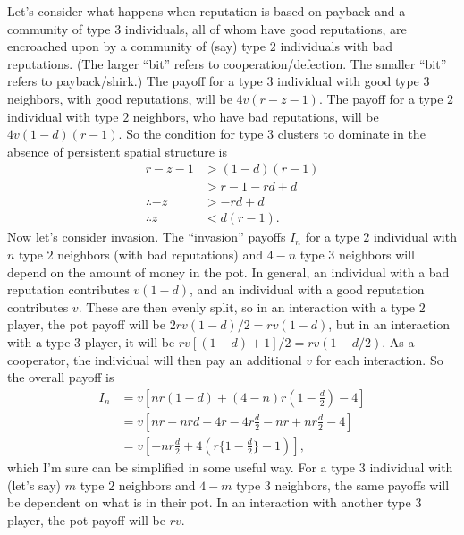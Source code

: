 \documentclass[14pt, a4paper, justified]{article}
\begin{document}
Let's consider what happens when reputation is based on payback and a community of type $3$ individuals, all of whom have good reputations, are encroached upon by a community of (say) type $2$ individuals with bad reputations.
(The larger ``bit'' refers to cooperation/defection.
The smaller ``bit'' refers to payback/shirk.)
The payoff for a type $3$ individual with good type $3$ neighbors, with good reputations, will be $4v(r - z - 1)$.
The payoff for a type $2$ individual with type $2$ neighbors, who have bad reputations, will be $4v(1-d)(r-1)$.
So the condition for type $3$ clusters to dominate in the absence of persistent spatial structure is
\begin{equation}
    \begin{split}
        r - z - 1 & > (1-d)(r-1) \\
        & > r - 1 - rd + d \\
        \therefore - z & > -rd + d \\
        \therefore z & < d(r-1).
    \end{split}
\end{equation}
Now let's consider invasion.
The ``invasion'' payoffs $I_n$ for a type $2$ individual with $n$ type $2$ neighbors (with bad reputations) and $4-n$ type $3$ neighbors will depend on the amount of money in the pot.
In general, an individual with a bad reputation contributes $v(1-d)$, and an individual with a good reputation contributes $v$.
These are then evenly split, so in an interaction with a type $2$ player, the pot payoff will be $2rv(1-d)/2 = rv(1-d)$, but in an interaction with a type $3$ player, it will be $rv[(1-d) + 1]/2 = rv(1 - d/2)$.
As a cooperator, the individual will then pay an additional $v$ for each interaction.
So the overall payoff is
\begin{equation}
    \begin{split}
        I_n & = v [nr(1-d) + (4-n)r(1 - \frac{d}{2}) - 4]\\
        & = v[nr - nrd + 4r - 4r\frac{d}{2} - nr + nr\frac{d}{2} - 4] \\
        & = v[-nr\frac{d}{2} + 4(r\{1 - \frac{d}{2}\} - 1)],
    \end{split}
    \label{eq:I_n}
\end{equation}
which I'm sure can be simplified in some useful way.
For a type $3$ individual with (let's say) $m$ type $2$ neighbors and $4 - m$ type $3$ neighbors, the same payoffs will be dependent on what is in their pot.
In an interaction with another type $3$ player, the pot payoff will be $rv$.
\end{document}
